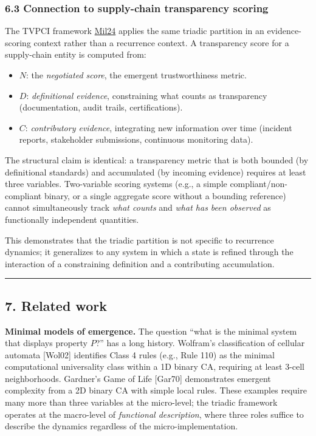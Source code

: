 \documentclass[
  11pt,
  letterpaper,
]{article}
\providecommand{\tightlist}{%
  \setlength{\itemsep}{0pt}\setlength{\parskip}{0pt}}
\begin{document}
\subsubsection{6.3 Connection to supply-chain transparency
scoring}\label{connection-to-supply-chain-transparency-scoring}

The TVPCI framework \href{https://tholonia.github.io/the-book/}{Mil24}
applies the same triadic partition in an evidence-scoring context rather
than a recurrence context. A transparency score for a supply-chain
entity is computed from:

\begin{itemize}
\tightlist
\item
  \(N\): the \emph{negotiated score}, the emergent trustworthiness
  metric.
\item
  \(D\): \emph{definitional evidence}, constraining what counts as
  transparency (documentation, audit trails, certifications).
\item
  \(C\): \emph{contributory evidence}, integrating new information over
  time (incident reports, stakeholder submissions, continuous monitoring
  data).
\end{itemize}

The structural claim is identical: a transparency metric that is both
bounded (by definitional standards) and accumulated (by incoming
evidence) requires at least three variables. Two-variable scoring
systems (e.g., a simple compliant/non-compliant binary, or a single
aggregate score without a bounding reference) cannot simultaneously
track \emph{what counts} and \emph{what has been observed} as
functionally independent quantities.

This demonstrates that the triadic partition is not specific to
recurrence dynamics; it generalizes to any system in which a state is
refined through the interaction of a constraining definition and a
contributing accumulation.

\begin{center}\rule{0.5\linewidth}{0.5pt}\end{center}

\subsection{7. Related work}\label{related-work}

\textbf{Minimal models of emergence.} The question ``what is the minimal
system that displays property \(P\)?'' has a long history. Wolfram's
classification of cellular automata {[}Wol02{]} identifies Class 4 rules
(e.g., Rule 110) as the minimal computational universality class within
a 1D binary CA, requiring at least 3-cell neighborhoods. Gardner's Game
of Life {[}Gar70{]} demonstrates emergent complexity from a 2D binary CA
with simple local rules. These examples require many more than three
variables at the micro-level; the triadic framework operates at the
macro-level of \emph{functional description}, where three roles suffice
to describe the dynamics regardless of the micro-implementation.
\end{document}
